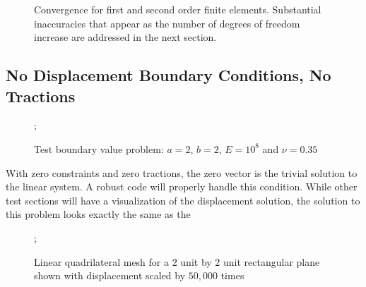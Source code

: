 \documentclass{article}
\begin{document}
\begin{figure}
    \caption{Convergence for first and second order finite elements. Substantial inaccuracies that appear as the number of degrees of freedom increase are addressed in the next section.}
\centering
\end{figure}

\pagebreak
\subsection{No Displacement Boundary Conditions, No Tractions}
\FloatBarrier

\begin{figure}
    ;
    \caption{Test boundary value problem: $a = 2$, $b = 2$, $E = 10^8$ and $\nu = 0.35$}
\centering
\end{figure}

With zero constraints and zero tractions, the zero vector is the trivial solution to the linear system. A robust code will properly handle this condition. While other test sections will have a visualization of the displacement solution, the solution to this problem looks exactly the same as the 

\begin{figure}
    ;
    \caption{Linear quadrilateral mesh for a 2 unit by 2 unit rectangular plane shown with displacement scaled by $50,000$ times}
\centering
\end{figure}
\end{document}
